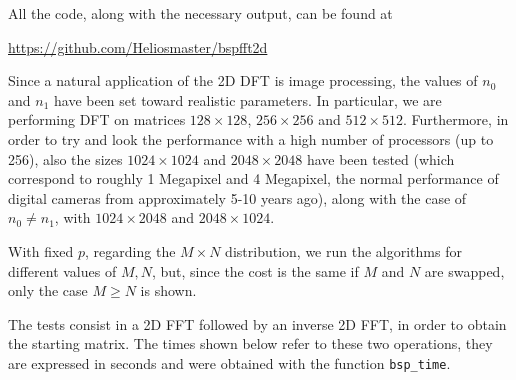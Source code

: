 \documentclass[a4paper,11pt]{article}
\begin{document}
All the code, along with the necessary output, can be found at

\begin{center}
 \url{https://github.com/Heliosmaster/bspfft2d}
\end{center}

Since a natural application of the 2D DFT is image processing, the values of $n_0$ and $n_1$ have been set toward realistic parameters. In particular, we are performing DFT on matrices $128 \times 128$, $256 \times 256$ and $512 \times 512$. Furthermore, in order to try and look the performance with a high number of processors (up to 256), also the sizes $1024 \times 1024$ and $2048 \times 2048$ have been tested (which correspond to roughly 1 Megapixel and 4 Megapixel, the normal performance of digital cameras from approximately 5-10 years ago), along with the case of $n_0 \neq n_1$, with $1024 \times 2048$ and $2048 \times 1024$.

With fixed $p$, regarding the $M \times N$ distribution, we run the algorithms for different values of $M,N$, but, since the cost is the same if $M$ and $N$ are swapped, only the case $M\geq N$ is shown.

The tests consist in a 2D FFT followed by an inverse 2D FFT, in order to obtain the starting matrix. The times shown below refer to these two operations, they are expressed in seconds and were obtained with the function \verb|bsp_time|.
\end{document}
